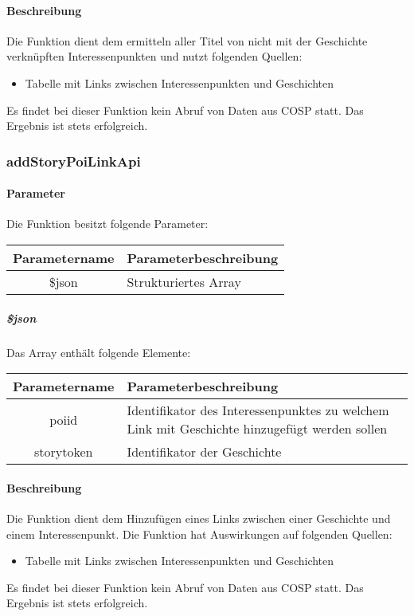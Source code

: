 \paragraph{Beschreibung} Die Funktion dient dem ermitteln aller Titel von nicht mit der Geschichte verknüpften Interessenpunkten und nutzt folgenden Quellen:
\begin{itemize}
	\item Tabelle mit Links zwischen Interessenpunkten und Geschichten
\end{itemize}
Es findet bei dieser Funktion kein Abruf von Daten aus {\glqq COSP\grqq} statt. Das Ergebnis ist stets erfolgreich.
\subsubsection{addStoryPoiLinkApi}
\paragraph{Parameter} Die Funktion besitzt folgende Parameter:
\begin{table}[H]
	\begin{tabular}{|c|p{11cm}|}
		\hline
		\textbf{Parametername} & \textbf{Parameterbeschreibung} \\ \hline
		\$json & Strukturiertes Array \\ \hline
	\end{tabular}
\end{table}
\subparagraph{\$json}Das Array enthält folgende Elemente:
\begin{table}[H]
	\begin{tabular}{|c|p{11cm}|}
		\hline
		\textbf{Parametername} & \textbf{Parameterbeschreibung} \\ \hline
		poiid & Identifikator des Interessenpunktes zu welchem Link mit Geschichte hinzugefügt werden sollen \\ \hline
		storytoken & Identifikator der Geschichte \\ \hline
	\end{tabular}
\end{table}
\paragraph{Beschreibung} Die Funktion dient dem Hinzufügen eines Links zwischen einer Geschichte und einem Interessenpunkt. Die Funktion hat Auswirkungen auf folgenden Quellen:
\begin{itemize}
	\item Tabelle mit Links zwischen Interessenpunkten und Geschichten
\end{itemize}
Es findet bei dieser Funktion kein Abruf von Daten aus {\glqq COSP\grqq} statt. Das Ergebnis ist stets erfolgreich.
